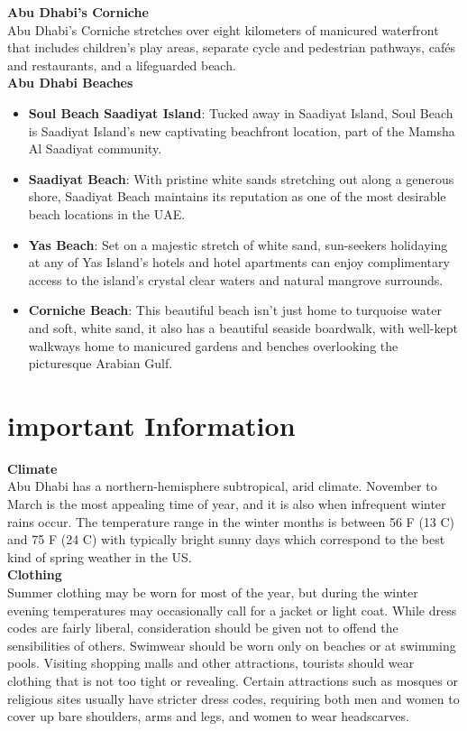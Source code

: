 {\large \textbf{Abu Dhabi’s Corniche}}\\
Abu Dhabi’s Corniche stretches over eight kilometers of manicured waterfront that includes children’s play areas,
separate cycle and pedestrian pathways, cafés and restaurants, and a lifeguarded beach.\\

{\large \textbf{Abu Dhabi Beaches}}\\
\begin{itemize}
    \itemsep-0.5em
    \item \textbf{Soul Beach Saadiyat Island}: Tucked away in Saadiyat Island, Soul Beach is Saadiyat Island’s new captivating beachfront location, part of the Mamsha Al Saadiyat community.
    \item \textbf{Saadiyat Beach}: With pristine white sands stretching out along a generous shore, Saadiyat Beach maintains its reputation as one of the most desirable beach locations in the UAE.
    \item \textbf{Yas Beach}: Set on a majestic stretch of white sand, sun-seekers holidaying at any of Yas Island’s hotels and hotel apartments can enjoy complimentary access to the island’s crystal clear waters and natural mangrove surrounds.
    \item \textbf{Corniche Beach}: This beautiful beach isn’t just home to turquoise water and soft, white sand, it also has a beautiful seaside boardwalk, with well-kept walkways home to manicured gardens and benches overlooking the picturesque Arabian Gulf.
\end{itemize}


 \leavevmode\newline
\section{important Information}

{\large \textbf{Climate}}\\
Abu Dhabi has a northern-hemisphere subtropical, arid climate. November to March is the most appealing time of year, and it is also when infrequent winter rains occur.
The temperature range in the winter months is between 56 F (13 C) and 75 F (24 C) with typically bright sunny days which correspond to the best kind of spring weather in the US.\\

{\large \textbf{Clothing}}\\
Summer clothing may be worn for most of the year, but during the winter evening temperatures may occasionally call for a jacket or light coat. 
While dress codes are fairly liberal, consideration should be given not to offend the sensibilities of others. 
Swimwear should be worn only on beaches or at swimming pools. Visiting shopping malls and other attractions, tourists should wear clothing that is not too tight or revealing. 
Certain attractions such as mosques or religious sites usually have stricter dress codes, requiring both men and women to cover up bare shoulders, arms and legs, and women to wear headscarves.\\

